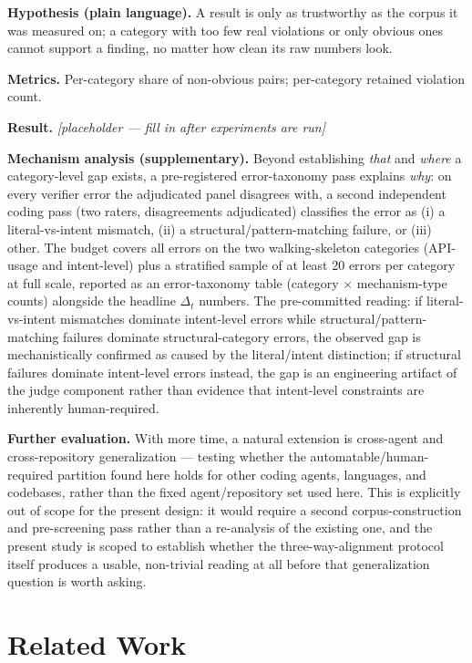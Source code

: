 \documentclass[11pt]{article}
\newcommand{\ph}{\textit{[placeholder --- fill in after experiments are run]}}
\begin{document}
\textbf{Hypothesis (plain language).} A result is only as trustworthy as the corpus it was measured on; a category with too few real violations or only obvious ones cannot support a finding, no matter how clean its raw numbers look.

\textbf{Metrics.} Per-category share of non-obvious pairs; per-category retained violation count.

\textbf{Result.} \ph

\vspace{0.5em}
\noindent\textbf{Mechanism analysis (supplementary).} Beyond establishing \emph{that} and \emph{where} a category-level gap exists, a pre-registered error-taxonomy pass explains \emph{why}: on every verifier error the adjudicated panel disagrees with, a second independent coding pass (two raters, disagreements adjudicated) classifies the error as (i) a literal-vs-intent mismatch, (ii) a structural/pattern-matching failure, or (iii) other. The budget covers all errors on the two walking-skeleton categories (API-usage and intent-level) plus a stratified sample of at least 20 errors per category at full scale, reported as an error-taxonomy table (category $\times$ mechanism-type counts) alongside the headline $\Delta_t$ numbers. The pre-committed reading: if literal-vs-intent mismatches dominate intent-level errors while structural/pattern-matching failures dominate structural-category errors, the observed gap is mechanistically confirmed as caused by the literal/intent distinction; if structural failures dominate intent-level errors instead, the gap is an engineering artifact of the judge component rather than evidence that intent-level constraints are inherently human-required.

\medskip
\noindent\textbf{Further evaluation.} With more time, a natural extension is cross-agent and cross-repository generalization --- testing whether the automatable/human-required partition found here holds for other coding agents, languages, and codebases, rather than the fixed agent/repository set used here. This is explicitly out of scope for the present design: it would require a second corpus-construction and pre-screening pass rather than a re-analysis of the existing one, and the present study is scoped to establish whether the three-way-alignment protocol itself produces a usable, non-trivial reading at all before that generalization question is worth asking.

\section{Related Work}
\end{document}
